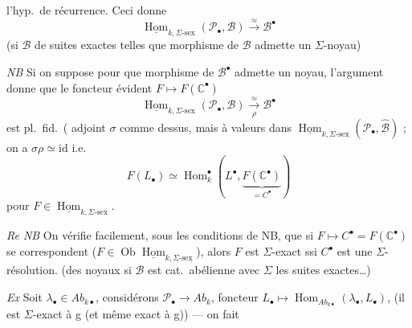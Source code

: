 \documentclass[11pt,a4paper]{article}
\begin{document}
l'hyp.\ de récurrence. Ceci donne 
\[
\underline{\operatorname{Hom}}_{k, \Sigma\text{-sex}}(\mathcal{P}_{\bullet}, \mathcal{B}) \xrightarrow{\ \approx\ } \mathcal{B}^{\bullet}
\]
(si $\mathcal{B}$ \ill{}   de suites exactes telles que
 morphisme de $\mathcal{B}$ admette un $\Sigma$-noyau)

\emph{NB} Si on suppose  
\add{\ill{}} pour  que  morphisme de $\mathcal{B}^{\bullet}$ admette un noyau,
l'argument donne    que le foncteur
évident $F \mapsto F(\mathbb{C}^{\bullet})$
\[
\underline{\operatorname{Hom}}_{k, \Sigma\text{-sex}}(\mathcal{P}_{\bullet}, \mathcal{B}) \xrightarrow[\rho]{\ \approx\ } \mathcal{B}^{\bullet}
\]
est pl.\ fid.\ ( adjoint $\sigma$ comme dessus, mais à valeurs dans
$\underline{\operatorname{Hom}}_{k, \Sigma\text{-sex}}(\mathcal{P}_{\bullet}, \widehat{\mathcal{B}})$ ;
on a  $\sigma\rho \simeq \mathrm{id}$ i.e.
\[
F(L_{\bullet}) \simeq \operatorname{Hom}^{\bullet}_k(L^{\bullet}, \underbrace{F(\mathbb{C}^{\bullet})}_{= C^{\bullet}})
\]
pour $F \in \underline{\operatorname{Hom}}_{k, \Sigma\text{-sex}}$.

\emph{Re NB} On \struck{\ill{}} vérifie facilement, sous les conditions de NB, que si
$F \mapsto C^{\bullet} = F(\mathbb{C}^{\bullet})$ se correspondent
($F \in \operatorname{Ob} \underline{\operatorname{Hom}}_{k, \Sigma\text{-sex}}$), alors
$F$ est $\Sigma$-exact ssi $C^{\bullet}$ est une $\Sigma$-résolution.
(des noyaux si $\mathcal{B}$ est cat.\ abélienne avec $\Sigma$ les suites exactes\ldots)

\emph{Ex} Soit $\lambda_{\bullet} \in \mathit{Ab}_{k\bullet}$, considérons
$\mathcal{P}_{\bullet} \to \mathit{Ab}_k$, foncteur $L_{\bullet} \mapsto \operatorname{Hom}_{\mathit{Ab}_{k\bullet}}(\lambda_{\bullet}, L_{\bullet})$,
(il est $\Sigma$-exact à g (et même exact à g)) --- on fait
\end{document}
